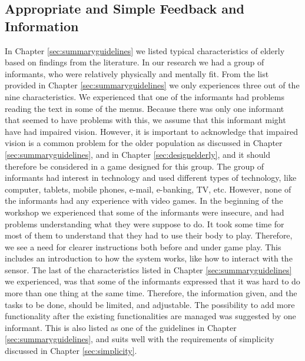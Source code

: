 \subsection{Appropriate and Simple Feedback and Information}
In Chapter \ref{sec:summaryguidelines} we listed typical characteristics of elderly based on findings from the literature. In our research we had a group of informants, who were relatively physically and mentally fit. From the list provided in Chapter \ref{sec:summaryguidelines} we only experiences three out of the nine characteristics. We experienced that one of the informants had problems reading the text in some of the menus. Because there was only one informant that seemed to have problems with this, we assume that this informant might have had impaired vision. However, it is important to acknowledge that impaired vision is a common problem for the older population as discussed in Chapter \ref{sec:summaryguidelines}, and in Chapter \ref{sec:designelderly}, and it should therefore be considered in a game designed for this group. The group of informants had interest in technology and used different types of technology, like computer, tablets, mobile phones, e-mail, e-banking, TV, etc. However, none of the informants had any experience with video games. In the beginning of the workshop we experienced that some of the informants were insecure, and had problems understanding what they were suppose to do. It took some time for most of them to understand that they had to use their body to play. Therefore, we see a need for clearer instructions both before and under game play. This includes an introduction to how the system works, like how to interact with the sensor. The last of the characteristics listed in Chapter \ref{sec:summaryguidelines}  we experienced, was that some of the informants expressed that it was hard to do more than one thing at the same time. Therefore, the information given, and the tasks to be done, should be limited, and adjustable. The possibility to add more functionality after the existing functionalities are managed was suggested by one informant. This is also listed as one of the guidelines in Chapter \ref{sec:summaryguidelines}, and suits well with the requirements of simplicity discussed in Chapter \ref{sec:simplicity}. 

